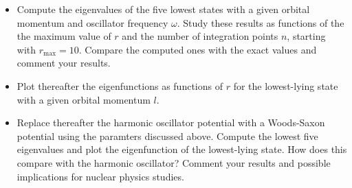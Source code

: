 \documentclass[%
twoside,                 %
final,                   %
10pt]{article}
\begin{document}
\begin{itemize}
\item Compute the eigenvalues of the five lowest states with a given orbital momentum and oscillator frequency $\omega$. Study these results as functions of the the maximum value of $r$ and the number of integration points $n$, starting with  $r_{\mathrm{max}}=10$. Compare the computed ones with the exact values and comment your results.

\item Plot thereafter the eigenfunctions as functions of $r$ for the lowest-lying state with a given orbital momentum $l$.

\item Replace thereafter the harmonic oscillator potential with a Woods-Saxon potential using the paramters discussed above. Compute the lowest five eigenvalues and plot the eigenfunction of the lowest-lying state. How does this compare with the harmonic oscillator? Comment your results and possible implications for nuclear physics studies.
\end{itemize}

\noindent






\printindex
\end{document}
